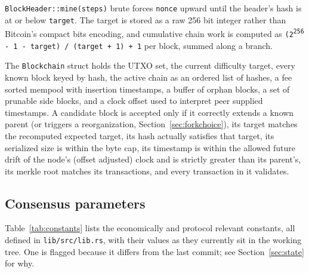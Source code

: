 \documentclass[11pt]{article}
\newcommand{\code}[1]{\texttt{#1}}
\begin{document}
\code{BlockHeader::mine(steps)} brute forces \code{nonce} upward until the header's hash is at or below \code{target}. The target is stored as a raw 256 bit integer rather than Bitcoin's compact bits encoding, and cumulative chain work is computed as \code{(2\textsuperscript{256} - 1 - target) / (target + 1) + 1} per block, summed along a branch.

The \code{Blockchain} struct holds the UTXO set, the current difficulty target, every known block keyed by hash, the active chain as an ordered list of hashes, a fee sorted mempool with insertion timestamps, a buffer of orphan blocks, a set of prunable side blocks, and a clock offset used to interpret peer supplied timestamps. A candidate block is accepted only if it correctly extends a known parent (or triggers a reorganization, Section~\ref{sec:forkchoice}), its target matches the recomputed expected target, its hash actually satisfies that target, its serialized size is within the byte cap, its timestamp is within the allowed future drift of the node's (offset adjusted) clock and is strictly greater than its parent's, its merkle root matches its transactions, and every transaction in it validates.

\subsection{Consensus parameters}

Table~\ref{tab:constants} lists the economically and protocol relevant constants, all defined in \code{lib/src/lib.rs}, with their values as they currently sit in the working tree. One is flagged because it differs from the last commit; see Section~\ref{sec:state} for why.
\end{document}
